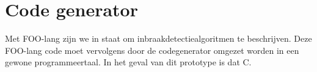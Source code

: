 
\section{Code generator}
\label{section:devel-codegen}

Met FOO-lang zijn we in staat om inbraakdetectiealgoritmen te beschrijven. Deze
FOO-lang code moet vervolgens door de codegenerator omgezet worden in een
gewone programmeertaal. In het geval van dit prototype is dat C.






